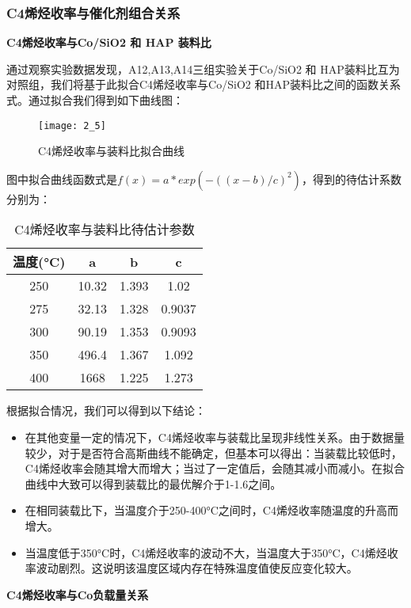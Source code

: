 \documentclass[withoutpreface,bwprint]{cumcmthesis} %
\begin{document}
\subsubsection{C4烯烃收率与催化剂组合关系}
\textbf{C4烯烃收率与Co/SiO2 和 HAP 装料比}

通过观察实验数据发现，A12,A13,A14三组实验关于Co/SiO2 和 HAP装料比互为对照组，我们将基于此拟合C4烯烃收率与Co/SiO2 和HAP装料比之间的函数关系式。通过拟合我们得到如下曲线图：

\begin{figure}[!h]
	\centering
	\texttt{[image: 2\_5]}
	\caption{C4烯烃收率与装料比拟合曲线}
	\label{fig:circuit-diagram1}
\end{figure}
图中拟合曲线函数式是$f(x) =  a*exp(-((x-b)/c)^2)$，得到的待估计系数分别为：
\begin{table}[!htbp]
	\caption{C4烯烃收率与装料比待估计参数}\label{tab:001} \centering
	\begin{tabular}{cccc}
		\toprule[1.5pt]
		温度(°C) & a & b & c \\
		\midrule[1pt]
		250 & 10.32 &  1.393 &  1.02\\
		275 & 32.13 &  1.328 & 0.9037 \\
		300 &90.19 &1.353&  0.9093 \\
		350 & 496.4 & 1.367& 1.092 \\
		400 & 1668  &  1.225 & 1.273\\
		\bottomrule[1.5pt]
	\end{tabular}
\end{table}

根据拟合情况，我们可以得到以下结论：
\begin{itemize}
	\item 在其他变量一定的情况下，C4烯烃收率与装载比呈现非线性关系。由于数据量较少，对于是否符合高斯曲线不能确定，但基本可以得出：当装载比较低时，C4烯烃收率会随其增大而增大；当过了一定值后，会随其减小而减小。在拟合曲线中大致可以得到装载比的最优解介于1-1.6之间。
	\item 在相同装载比下，当温度介于250-400°C之间时，C4烯烃收率随温度的升高而增大。
	\item 当温度低于350°C时，C4烯烃收率的波动不大，当温度大于350°C，C4烯烃收率波动剧烈。这说明该温度区域内存在特殊温度值使反应变化较大。
\end{itemize}


\textbf{C4烯烃收率与Co负载量关系}
\end{document}
